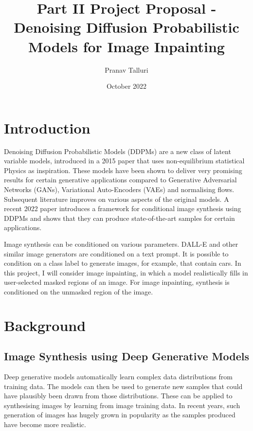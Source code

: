 \documentclass{article}
\title{Part II Project Proposal - Denoising Diffusion Probabilistic Models for Image Inpainting}
\author{Pranav Talluri}
\date{October 2022}
\begin{document}
\maketitle
\tableofcontents
\newpage

\section{Introduction}

Denoising Diffusion Probabilistic Models (DDPMs) are a new class of latent variable models, introduced in a 2015 paper \cite{Sohl-Dickstein-2015} that uses non-equilibrium statistical Physics as inspiration. These models have been shown to deliver very promising results for certain generative applications compared to Generative Adversarial Networks (GANs), Variational Auto-Encoders (VAEs) and normalising flows. Subsequent literature improves on various aspects of the original models. A recent 2022 paper \cite{Saharia-2022} introduces a framework for conditional image synthesis using DDPMs and shows that they can produce state-of-the-art samples for certain applications.

Image synthesis can be conditioned on various parameters. DALL-E and other similar image generators are conditioned on a text prompt. It is possible to condition on a class label to generate images, for example, that contain cars. In this project, I will consider image inpainting, in which a model realistically fills in user-selected masked regions of an image. For image inpainting, synthesis is conditioned on the unmasked region of the image.

\section{Background}

\subsection{Image Synthesis using Deep Generative Models}

Deep generative models automatically learn complex data distributions from training data. The models can then be used to generate new samples that could have plausibly been drawn from those distributions. These can be applied to synthesising images by learning from image training data. In recent years, such generation of images has hugely grown in popularity as the samples produced have become more realistic.
\end{document}
